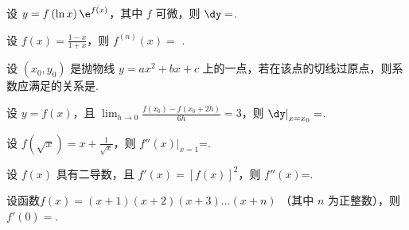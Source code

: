 
\begin{problem}
设 $y = f\left( \ln x \right)\e^{f\left( x \right)}$，其中 $f$
可微，则 $\dy =$.


\end{problem}           

\begin{problem}
设 $\displaystyle f\left( x \right) = \frac{1 - x}{1 + x}$，则
$f^{(n)}\left( x \right) =$ .


\end{problem} 

          
\begin{problem}
	设 $(x_{0},y_{0})$ 是抛物线 $y = {ax}^{2} + bx + c$
上的一点，若在该点的切线过原点，则系数应满足的关系是.


\end{problem}           


\begin{problem}
设 $y = f(x)$，且
$\displaystyle \lim_{h \rightarrow 0}\frac{f\left( x_{0} \right) - f\left( x_{0} + 2h \right)}{6h} = 3$，则
${\dy|}_{x = x_{0}} =$\fillin{$- 9\dx$}.


\end{problem} 

          
\begin{problem}
设 $\displaystyle f\left( \sqrt{x} \right) = x + \frac{1}{\sqrt{x}}$，则
$\displaystyle f''{\left( x \right)|}_{x = 1}$=.


\end{problem}           


\begin{problem}
设 $f(x)$ 具有二导数，且
$f'\left( x \right) = \left[ f\left( x \right) \right]^{2}$，则
$f''(x)$=.


\end{problem}           


\begin{problem}
设函数$f\left( x \right) = \left( x + 1 \right)\left( x + 2 \right)\left( x + 3 \right)\ldots(x + n)$
（其中 $n$ 为正整数），则$f'\left( 0 \right) =$.


\end{problem}           

